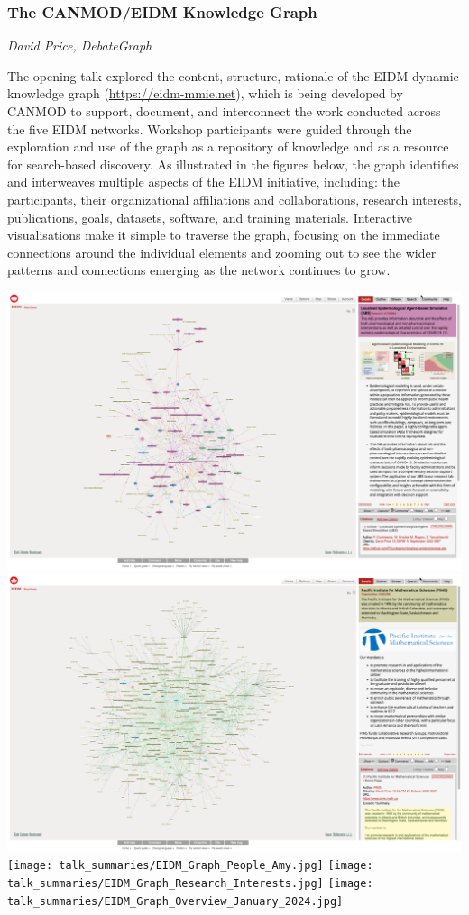 \subsubsection*{The CANMOD/EIDM Knowledge Graph}
\textit{David Price, DebateGraph}

The opening talk explored the content, structure, rationale of the EIDM dynamic knowledge graph (\url{https://eidm-mmie.net}), which is being developed by CANMOD to support, document, and interconnect the work conducted across the five EIDM networks. Workshop participants were guided through the exploration and use of the graph as a repository of knowledge and as a resource for search-based discovery. As illustrated in the figures below, the graph identifies and interweaves multiple aspects of the EIDM initiative, including: the participants, their organizational affiliations and collaborations, research interests, publications, goals, datasets, software, and training materials. Interactive visualisations make it simple to traverse the graph, focusing on the immediate connections around the individual elements and zooming out to see the wider patterns and connections emerging as the network continues to grow.

\begin{center}

\includegraphics[width=\textwidth]{talk_summaries/EIDM_Graph_Software.jpg}
\includegraphics[width=\textwidth]{talk_summaries/EIDM_Graph_Orgs_PIMS.jpg}
\texttt{[image: talk\_summaries/EIDM\_Graph\_People\_Amy.jpg]}
\texttt{[image: talk\_summaries/EIDM\_Graph\_Research\_Interests.jpg]}
\texttt{[image: talk\_summaries/EIDM\_Graph\_Overview\_January\_2024.jpg]}

\end{center}
